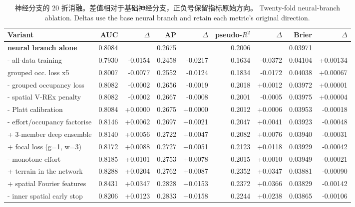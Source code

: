 \begin{table}[htbp]\centering\footnotesize
\caption{\ifzh
神经分支的 20 折消融。差值相对于基础神经分支，正负号保留指标原始方向。
\else
Twenty-fold neural-branch ablation. Deltas use the base neural branch and retain each metric's original direction.
\fi}\label{tab:ablation}
\begin{adjustbox}{max width=\linewidth}
\begin{tabular}{lrrrrrrrr}\toprule
Variant & AUC & $\Delta$ & AP & $\Delta$ & pseudo-$R^2$ & $\Delta$ & Brier & $\Delta$ \\ \midrule
\textbf{neural branch alone} & 0.8084 &  & 0.2675 &  & 0.2006 &  & 0.03971 &  \\
  - all-data training & 0.7930 & -0.0154 & 0.2458 & -0.0217 & 0.1634 & -0.0372 & 0.04104 & +0.00134 \\
  grouped occ. loss x5 & 0.8007 & -0.0077 & 0.2552 & -0.0124 & 0.1834 & -0.0172 & 0.04038 & +0.00067 \\
  - grouped occupancy loss & 0.8082 & -0.0002 & 0.2656 & -0.0019 & 0.2018 & +0.0012 & 0.03972 & +0.00001 \\
  - spatial V-REx penalty & 0.8082 & -0.0002 & 0.2667 & -0.0008 & 0.2001 & -0.0005 & 0.03975 & +0.00004 \\
  - Platt calibration & 0.8084 & +0.0000 & 0.2675 & +0.0000 & 0.2012 & +0.0006 & 0.03953 & -0.00018 \\
  - effort/occupancy factorise & 0.8146 & +0.0062 & 0.2697 & +0.0021 & 0.2047 & +0.0041 & 0.03923 & -0.00048 \\
  + 3-member deep ensemble & 0.8140 & +0.0056 & 0.2722 & +0.0047 & 0.2082 & +0.0076 & 0.03940 & -0.00031 \\
  + focal loss (g=1, w=3) & 0.8172 & +0.0088 & 0.2727 & +0.0051 & 0.2123 & +0.0118 & 0.03929 & -0.00042 \\
  - monotone effort & 0.8185 & +0.0101 & 0.2753 & +0.0078 & 0.2015 & +0.0010 & 0.03949 & -0.00021 \\
  + terrain in the network & 0.8288 & +0.0204 & 0.2762 & +0.0087 & 0.2352 & +0.0347 & 0.03881 & -0.00090 \\
  + spatial Fourier features & 0.8431 & +0.0347 & 0.2828 & +0.0153 & 0.2372 & +0.0366 & 0.03829 & -0.00142 \\
  - inner spatial early stop & 0.8206 & +0.0123 & 0.2833 & +0.0158 & 0.2244 & +0.0238 & 0.03865 & -0.00106 \\
\bottomrule\end{tabular}
\end{adjustbox}\end{table}